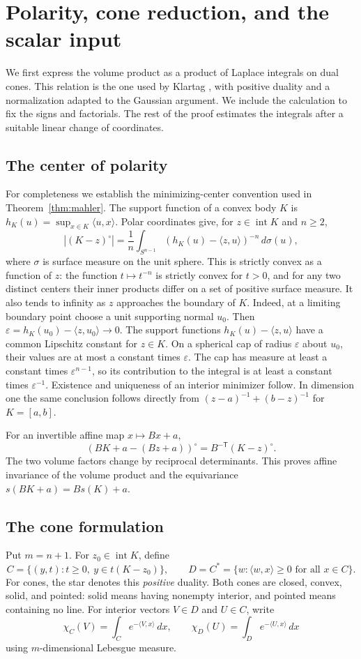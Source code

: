 \section{Polarity, cone reduction, and the scalar input}\label{sec:01-cones}

We first express the volume product as a product of Laplace integrals on
dual cones. This relation is the one used by Klartag
\cite[Lemma~2.1 and Corollary~4.1]{Klartag2018}, with positive duality and
a normalization adapted to the Gaussian argument. We include the
calculation to fix the signs and factorials. The rest of the proof
estimates the integrals after a suitable linear change of coordinates.

\subsection{The center of polarity}
For completeness we establish the minimizing-center convention used in
Theorem~\ref{thm:mahler}. The support function of a convex body $K$ is
$h_K(u)=\sup_{x\in K}\langle u,x\rangle$. Polar coordinates give, for
$z\in\operatorname{int}K$ and $n\ge2$,
\[
 |(K-z)^\circ|=\frac1n\int_{S^{n-1}}
      (h_K(u)-\langle z,u\rangle)^{-n}\,d\sigma(u),
\]
where $\sigma$ is surface measure on the unit sphere.
This is strictly convex as a function of $z$: the function $t\mapsto t^{-n}$
is strictly convex for $t>0$, and for any two distinct centers their
inner products differ on a set of positive surface measure.
It also tends to infinity as $z$ approaches the boundary of $K$.
Indeed, at a limiting boundary point choose a unit supporting normal $u_0$.
Then $\varepsilon=h_K(u_0)-\langle z,u_0\rangle\to0$.
The support functions $h_K(u)-\langle z,u\rangle$ have a common Lipschitz
constant for $z\in K$. On a spherical cap of radius $\varepsilon$ about
$u_0$, their values are at most a constant times $\varepsilon$.
The cap has measure at least a constant times $\varepsilon^{n-1}$,
so its contribution to the integral is at least a constant times
$\varepsilon^{-1}$. Existence and uniqueness of an interior minimizer
follow. In dimension one the same conclusion follows directly from
$(z-a)^{-1}+(b-z)^{-1}$ for $K=[a,b]$.

For an invertible affine map $x\mapsto Bx+a$,
\[
 (BK+a-(Bz+a))^\circ=B^{-\mathsf T}(K-z)^\circ.
\]
The two volume factors change by reciprocal determinants. This proves
affine invariance of the volume product and the equivariance
$s(BK+a)=Bs(K)+a$.

\subsection{The cone formulation}
Put \(m=n+1\). For \(z_0\in\operatorname{int}K\), define
\[
C=\{(y,t):t\ge0,\ y\in t(K-z_0)\},\qquad
D=C^*=\{w:\langle w,x\rangle\ge0\text{ for all }x\in C\}.
\]
For cones, the star denotes this \emph{positive} duality. Both cones are closed, convex, solid, and pointed: solid means having nonempty interior, and pointed means containing no line. For interior vectors \(V\in D\) and \(U\in C\), write
\[
 \chi_C(V)=\int_C e^{-\langle V,x\rangle}\,dx,\qquad
 \chi_D(U)=\int_D e^{-\langle U,x\rangle}\,dx
\]
using \(m\)-dimensional Lebesgue measure.

